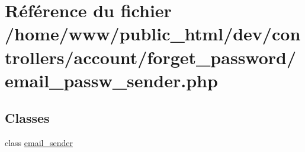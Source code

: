 \hypertarget{email__passw__sender_8php}{\section{Référence du fichier /home/www/public\-\_\-html/dev/controllers/account/forget\-\_\-password/email\-\_\-passw\-\_\-sender.php}
\label{email__passw__sender_8php}
}
\subsection*{Classes}
\begin{DoxyCompactItemize}
\item 
class \hyperlink{classemail__sender}{email\-\_\-sender}
\end{DoxyCompactItemize}
